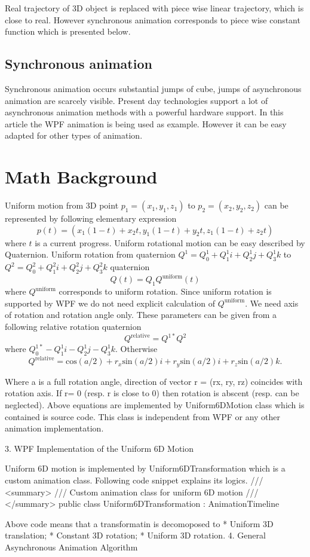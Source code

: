 \documentclass[10pt,journal,compsoc]{IEEEtran}
\begin{document}
Real trajectory of 3D object is replaced with {piece wise linear} trajectory, which is close to real. However synchronous animation corresponds to {piece wise constant function} which is presented below.

\subsection{Synchronous animation}

Synchronous animation occurs substantial jumps of cube, jumps of asynchronous animation are scarcely visible. Present day technologies support a lot of asynchronous animation methods with a powerful hardware support. In this article the WPF animation is being used as example. However it can be easy adapted for other types of animation.

\section{Math Background}	
Uniform motion from 3D point $p_1 = (x_1, y_1, z_1)$ to $p_2 = (x_2, y_2, z_2)$ can be represented by following elementary expression
$$
p(t) = (x_1(1 - t) + x_2t, y_1(1 - t) + y_2t, z_1(1 - t) + z_2t) 
$$
where $t$ is a current progress. Uniform rotational motion can be easy described by {Quaternion}. Uniform rotation from quaternion $Q^1 = Q_0^1 + Q_1^1i + Q_2^1j + Q_3^1k$ to  $Q^2 = Q_0^2 + Q_1^2i + Q_2^2j + Q_3^2k$
quaternion 
$$
Q(t) = Q_1Q^{\text{uniform}}(t)
$$
where $Q^{\text{uniform}}$ corresponds to uniform rotation. Since uniform rotation is supported by WPF we do not need explicit calculation of $Q^{\text{uniform}}$. We need {axis of rotation and rotation angle} only. These parameters can be given from a following relative rotation quaternion
$$
Q^{\text{relative}}= Q^{1*}Q^2
$$
where $Q_0^{1*} - Q_1^1i - Q_2^1j - Q_3^1k$.
Otherwise
$$
Q^{\text{relative}}= \text{cos} (a/2) + r_x\text{sin}(a/2)i + r_y\text{sin}(a/2)i + r_z\text{sin}(a/2)k.
$$

Where a is a full rotation angle, direction of vector r = (rx, ry, rz) coincides with rotation axis. If r= 0 (resp. r is close to 0) then rotation is abscent (resp. can be neglected). Above equations are implemented by Uniform6DMotion class which is contained is source code. This class is independent from WPF or any other animation implementation.

3. WPF Implementation of the Uniform 6D Motion

Uniform 6D motion is implemented by Uniform6DTransformation which is a {custom animation class}. Following code snippet explains its logics.
/// <summary>
/// Custom animation class for uniform 6D motion
/// </summary>
public class Uniform6DTransformation : AnimationTimeline
{
	
}
Above code means that a transformatin is decomoposed to
* Uniform 3D translation; 
* Constant 3D rotation; 
* Uniform 3D rotation. 
4. General Asynchronous Animation Algorithm
\end{document}
